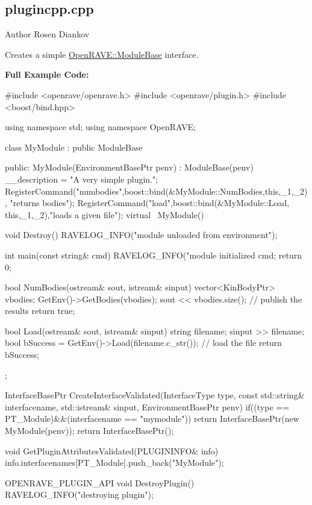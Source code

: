 \hypertarget{plugincpp.cpp-example}{
\subsection{plugincpp.cpp}
}
\begin{DoxyAuthor}{Author}
Rosen Diankov
\end{DoxyAuthor}
Creates a simple \hyperlink{classOpenRAVE_1_1ModuleBase}{OpenRAVE::ModuleBase} interface.

{\bfseries Full Example Code:}


\begin{DoxyCodeInclude}

#include <openrave/openrave.h>
#include <openrave/plugin.h>
#include <boost/bind.hpp>

using namespace std;
using namespace OpenRAVE;

class MyModule : public ModuleBase
{
public:
    MyModule(EnvironmentBasePtr penv) : ModuleBase(penv)
    {
        __description = "A very simple plugin.";
        RegisterCommand("numbodies",boost::bind(&MyModule::NumBodies,this,_1,_2),
      "returns bodies");
        RegisterCommand("load",boost::bind(&MyModule::Load, this,_1,_2),"loads a 
      given file");
    }
    virtual ~MyModule() {
    }

    void Destroy() {
        RAVELOG_INFO("module unloaded from environment\n");
    }

    int main(const string& cmd)
    {
        RAVELOG_INFO("module initialized cmd; %
        return 0;
    }

    bool NumBodies(ostream& sout, istream& sinput)
    {
        vector<KinBodyPtr> vbodies;
        GetEnv()->GetBodies(vbodies);
        sout << vbodies.size();     // publish the results
        return true;
    }

    bool Load(ostream& sout, istream& sinput)
    {
        string filename;
        sinput >> filename;
        bool bSuccess = GetEnv()->Load(filename.c_str());     // load the file
        return bSuccess;
    }
};

InterfaceBasePtr CreateInterfaceValidated(InterfaceType type, const std::string& 
      interfacename, std::istream& sinput, EnvironmentBasePtr penv)
{
    if((type == PT_Module)&&(interfacename == "mymodule")) {
        return InterfaceBasePtr(new MyModule(penv));
    }
    return InterfaceBasePtr();
}

void GetPluginAttributesValidated(PLUGININFO& info)
{
    info.interfacenames[PT_Module].push_back("MyModule");
}

OPENRAVE_PLUGIN_API void DestroyPlugin()
{
    RAVELOG_INFO("destroying plugin\n");
}
\end{DoxyCodeInclude}
 